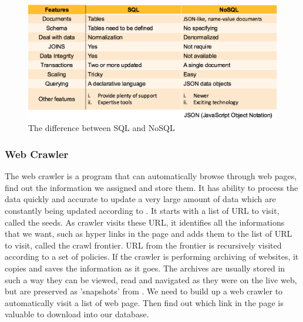 \begin{figure}[tbh]
	\begin{center}
		\includegraphics[width=\columnwidth]{Wolverine_Method_Chart_3}
	\end{center}
	\caption{The difference between SQL and NoSQL}
\end{figure}
	
\subsubsection{Web Crawler}
The web crawler is a program that can automatically browse through web pages, find out the information we assigned and store them.
It has ability to process the data quickly and accurate to update a very large amount of data which are constantly being updated according to \cite{Liu2012}.
It starts with a list of URL to visit, called the seeds.
As crawler visits these URL, it identifies all the informations that we want, such as hyper links in the page and adds them to the list of URL to visit, called the crawl frontier.
URL from the frontier is recursively visited according to a set of policies.
If the crawler is performing archiving of websites, it copies and saves the information as it goes.
The archives are usually stored in such a way they can be viewed, read and navigated as they were on the live web, but are preserved as 'snapshots' from \cite{Du2013}.
We need to build up a web crawler to automatically visit a list of web page.
Then find out which link in the page is valuable to download into our database.

\newpage %
